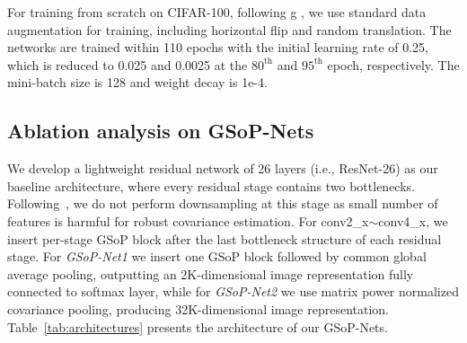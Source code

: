 \documentclass[10pt,twocolumn,letterpaper]{article}
\begin{document}
For training  from scratch on CIFAR-100, following g \cite{He2016_ECCV,Hu_2018_CVPR_SE}, we use  standard data augmentation for training, including horizontal flip and random translation. The networks are trained within 110 epochs with the initial learning rate of 0.25,  which is reduced to 0.025 and 0.0025 at the $80^{\mathrm{th}}$ and $95^{\mathrm{th}}$ epoch, respectively. The mini-batch size is  128 and weight decay is 1e-4.

\vspace{-2pt}\subsection{Ablation analysis on GSoP-Nets}\label{subsection:ablation}


We  develop a lightweight residual network of 26 layers (i.e., ResNet-26) as our baseline architecture, where every residual stage contains two bottlenecks. Following~\cite{Li_2017_ICCV}, we do not perform downsampling at this stage as small number of features is harmful for robust covariance estimation.  For conv2\_x$\sim$conv4\_x, we insert per-stage GSoP block   after the last bottleneck structure of each residual stage. For \textit{GSoP-Net1} we insert one GSoP block followed by common global average pooling, outputting an 2K-dimensional image representation  fully connected to softmax  layer, while for  \textit{GSoP-Net2} we use matrix power normalized covariance pooling, producing 32K-dimensional image representation. Table~\ref{tab:architectures} presents the architecture of our GSoP-Nets.
\end{document}
